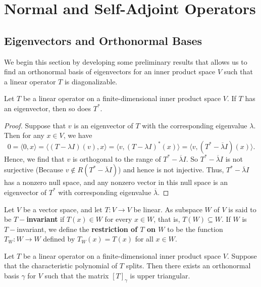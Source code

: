\section{Normal and Self-Adjoint Operators}

\subsection{Eigenvectors and Orthonormal Bases}

We begin this section by developing some preliminary results that allows us to find an orthonormal basis of eigenvectors for an inner product space \( V  \) such that a linear operator \(  T  \) is diagonalizable.

\begin{lemma}
    Let \( T  \) be a linear operator on a finite-dimensional inner product space \( V  \). If \( T  \) has an eigenvector, then so does \( T^{*} \).
\end{lemma}
\begin{proof}
Suppose that \( v  \) is an eigenvector of \( T  \) with the corresponding eigenvalue \( \lambda  \). Then for any \( x \in V  \), we have
\[  0 = \langle 0  , x  \rangle =  \langle  (T - \lambda I )(v) , x   \rangle = \langle v  ,  (T - \lambda I )^{*}(x) \rangle = \langle v  ,  (T^{*} - \overline{\lambda} I)(x) \rangle. \]
Hence, we find that \( v  \) is orthogonal to the range of \( T^{*} - \overline{\lambda} I  \). So \( T^{*} - \overline{\lambda} I  \) is not surjective (Because \( v \notin R(T^{*} - \overline{\lambda} I ) \)) and hence is not injective. Thus,  \( T^{*} - \overline{\lambda}I  \) has a nonzero null space, and any nonzero vector in this null space is an eigenvector of \( T^{*} \) with corresponding eigenvalue \( \overline{\lambda} \).
\end{proof}

\begin{definition}[T-Invariance]
    Let \( V  \) be a vector space, and let \( T: V \to V  \) be linear. As subspace \( W  \) of \( V  \) is said to be \textbf{\( T- \)invariant} if \( T(x) \in W  \) for every \( x \in W  \), that is, \( T(W) \subseteq W  \). If \( W  \) is \( T- \)invariant, we define the \textbf{restriction of \( T \) on \( W  \)} to be the function \( {T}_{W}: W \to W  \) defined by \( {T}_{W}(x) = T(x) \) for all \( x \in W \).
\end{definition}

\begin{theorem}[Schur]\label{Schur}
    Let \( T  \) be a linear operator on a finite-dimensional inner product space \( V  \). Suppose that the characteristic polynomial of \( T \) splits. Then there exists an orthonormal basis \( \gamma \) for \( V  \) such that the matrix \( [T]_{\gamma} \) is upper triangular.
\end{theorem}

